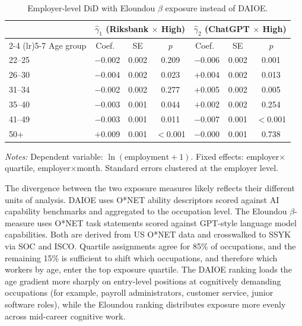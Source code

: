 \documentclass[preprint,12pt,authoryear]{elsarticle}
\begin{document}
\begin{table}[htbp]
\centering
\caption{Employer-level DiD with Eloundou $\beta$ exposure instead of DAIOE.}
\label{tab:eloundou_did}
\footnotesize
\begin{tabular}{@{}lcccccc@{}}
\toprule
 & \multicolumn{3}{c}{$\hat\gamma_1$ (Riksbank $\times$ High)} & \multicolumn{3}{c}{$\hat\gamma_2$ (ChatGPT $\times$ High)} \\
\cmidrule(lr){2-4} \cmidrule(lr){5-7}
Age group & Coef.\ & SE & $p$ & Coef.\ & SE & $p$ \\
\midrule
22--25 & $-$0.002 & 0.002 & 0.209 & $-$0.006 & 0.002 & 0.001 \\
26--30 & $-$0.004 & 0.002 & 0.023 & $+$0.004 & 0.002 & 0.013 \\
31--34 & $-$0.002 & 0.002 & 0.277 & $+$0.005 & 0.002 & 0.005 \\
35--40 & $-$0.003 & 0.001 & 0.044 & $+$0.002 & 0.002 & 0.254 \\
41--49 & $-$0.003 & 0.001 & 0.011 & $-$0.007 & 0.001 & $<$0.001 \\
50+    & $+$0.009 & 0.001 & $<$0.001 & $-$0.000 & 0.001 & 0.738 \\
\bottomrule
\end{tabular}
\par\medskip
\noindent\parbox{\linewidth}{\raggedright\scriptsize \emph{Notes:} Dependent variable: $\ln(\text{employment} + 1)$. Fixed effects: employer$\times$quartile, employer$\times$month. Standard errors clustered at the employer level.}

\end{table}

The divergence between the two exposure measures likely reflects their different units of analysis. DAIOE uses O*NET ability descriptors scored against AI capability benchmarks and aggregated to the occupation level. The Eloundou $\beta$-measure uses O*NET task statements scored against GPT-style language model capabilities. Both are derived from US O*NET data and crosswalked to SSYK via SOC and ISCO. Quartile assignments agree for 85\% of occupations, and the remaining 15\% is sufficient to shift which occupations, and therefore which workers by age, enter the top exposure quartile. The DAIOE ranking loads the age gradient more sharply on entry-level positions at cognitively demanding occupations (for example, payroll administrators, customer service, junior software roles), while the Eloundou ranking distributes exposure more evenly across mid-career cognitive work.
\end{document}
